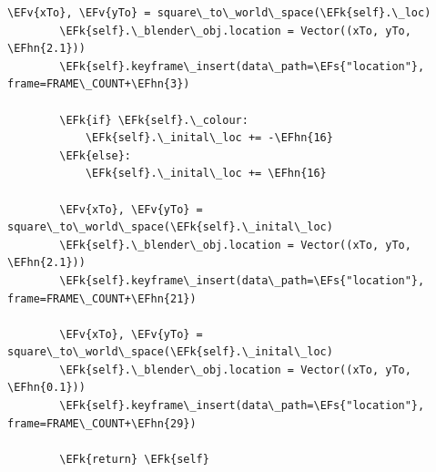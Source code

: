 \documentclass[11pt]{article}
\newcommand{\EFk}[1]{\textcolor{EFk}{#1}} %
\newcommand{\EFs}[1]{\textcolor{EFs}{#1}} %
\newcommand{\EFv}[1]{\textcolor{EFv}{#1}} %
\newcommand{\EFhn}[1]{\textcolor{EFhn}{\textbf{#1}}} %
\begin{document}
\begin{Code}
\begin{Verbatim}[]
        \EFv{xTo}, \EFv{yTo} = square\_to\_world\_space(\EFk{self}.\_loc)
        \EFk{self}.\_blender\_obj.location = Vector((xTo, yTo, \EFhn{2.1}))
        \EFk{self}.keyframe\_insert(data\_path=\EFs{"location"}, frame=FRAME\_COUNT+\EFhn{3})

        \EFk{if} \EFk{self}.\_colour:
            \EFk{self}.\_inital\_loc += -\EFhn{16}
        \EFk{else}:
            \EFk{self}.\_inital\_loc += \EFhn{16}

        \EFv{xTo}, \EFv{yTo} = square\_to\_world\_space(\EFk{self}.\_inital\_loc)
        \EFk{self}.\_blender\_obj.location = Vector((xTo, yTo, \EFhn{2.1}))
        \EFk{self}.keyframe\_insert(data\_path=\EFs{"location"}, frame=FRAME\_COUNT+\EFhn{21})

        \EFv{xTo}, \EFv{yTo} = square\_to\_world\_space(\EFk{self}.\_inital\_loc)
        \EFk{self}.\_blender\_obj.location = Vector((xTo, yTo, \EFhn{0.1}))
        \EFk{self}.keyframe\_insert(data\_path=\EFs{"location"}, frame=FRAME\_COUNT+\EFhn{29})

        \EFk{return} \EFk{self}
\end{Verbatim}
\end{Code}
\label{class-src}

\newpage
\printbibliography
\end{document}
